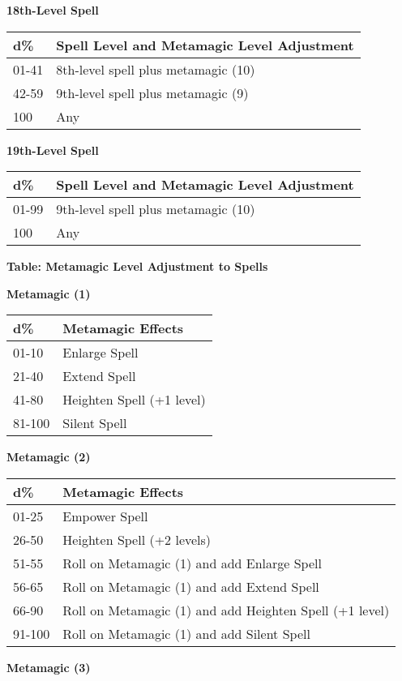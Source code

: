 \documentclass{article}
\begin{document}
\vspace{12pt}
\textbf{18th-Level Spell }

\begin{tabular}{|>{\raggedright}p{29pt}|>{\raggedright}p{201pt}|}
\hline
d\textbf{\%} & S\textbf{pell Level and Metamagic Level Adjustment }\tabularnewline
\hline
01-41 & 8th-level spell plus metamagic (10) \tabularnewline
\hline
42-59 & 9th-level spell plus metamagic (9) \tabularnewline
\hline
100 & Any\tabularnewline
\hline
\end{tabular}

\vspace{12pt}
\textbf{19th-Level Spell }

\begin{tabular}{|>{\raggedright}p{23pt}|>{\raggedright}p{201pt}|}
\hline
d\textbf{\%} & S\textbf{pell Level and Metamagic Level Adjustment }\tabularnewline
\hline
01-99 & 9th-level spell plus metamagic (10) \tabularnewline
\hline
100 & Any\tabularnewline
\hline
\end{tabular}

\vspace{12pt}
\textbf{Table: Metamagic Level Adjustment to Spells }

\textbf{Metamagic (1) }

\begin{tabular}{|>{\raggedright}p{38pt}|>{\raggedright}p{107pt}|}
\hline
d\textbf{\%} & M\textbf{etamagic Effects }\tabularnewline
\hline
01-10 & Enlarge Spell \tabularnewline
\hline
21-40 & Extend Spell \tabularnewline
\hline
41-80 & Heighten Spell (+1 level) \tabularnewline
\hline
81-100 & Silent Spell \tabularnewline
\hline
\end{tabular}

\vspace{12pt}
\textbf{Metamagic (2) }

\begin{tabular}{|>{\raggedright}p{38pt}|>{\raggedright}p{235pt}|}
\hline
d\textbf{\%} & M\textbf{etamagic Effects }\tabularnewline
\hline
01-25 & Empower Spell \tabularnewline
\hline
26-50 & Heighten Spell (+2 levels) \tabularnewline
\hline
51-55 & Roll on Metamagic (1) and add Enlarge Spell \tabularnewline
\hline
56-65 & Roll on Metamagic (1) and add Extend Spell \tabularnewline
\hline
66-90 & Roll on Metamagic (1) and add Heighten Spell (+1 level) \tabularnewline
\hline
91-100 & Roll on Metamagic (1) and add Silent Spell \tabularnewline
\hline
\end{tabular}

\vspace{12pt}
\textbf{Metamagic (3) }
\end{document}
